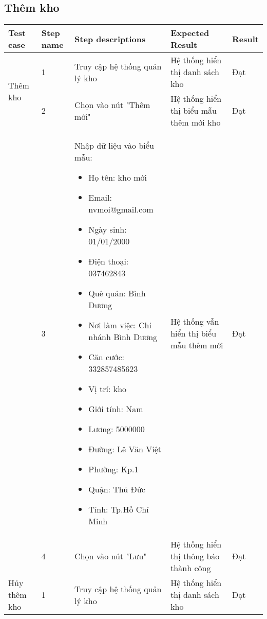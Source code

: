 \subsection{Thêm kho}
{
    \setlength\extrarowheight{6pt}
    \begin{longtable}{| p{2.5cm}| p{1cm}| p{5.5cm}| p{4.5cm} | p{1.5cm} |}
        \hline
        \textbf{Test case} & \textbf{Step name} & \textbf{Step descriptions} & \textbf{Expected Result} & \textbf{Result} \\
        \hline
        \multirow[t]{2}{2.5cm}{Thêm kho} & 1 & Truy cập hệ thống quản lý kho & Hệ thống hiển thị danh sách kho & Đạt \\
        \cline{2-5}
         & 2 & Chọn vào nút "Thêm mới" & Hệ thống hiển thị biểu mẫu thêm mới kho & Đạt \\
        \cline{2-5}
        & 3 & Nhập dữ liệu vào biểu mẫu:
        \begin{itemize}
            \item Họ tên: kho mới
            \item Email: nvmoi@gmail.com
            \item Ngày sinh: 01/01/2000
            \item Điện thoại: 037462843
            \item Quê quán: Bình Dương
            \item Nơi làm việc: Chi nhánh Bình Dương
            \item Căn cước: 332857485623
            \item Vị trí: kho
            \item Giới tính: Nam
            \item Lương: 5000000
            \item Đường: Lê Văn Việt
            \item Phường: Kp.1
            \item Quận: Thủ Đức 
            \item Tỉnh: Tp.Hồ Chí Minh
        \end{itemize} & Hệ thống vẫn hiển thị biểu mẫu thêm mới & Đạt \\
        \cline{2-5}
         & 4 & Chọn vào nút "Lưu" & Hệ thống hiển thị thông báo thành công & Đạt \\
        \hline
        \multirow[t]{2}{2.5cm}{Hủy thêm kho} & 1 & Truy cập hệ thống quản lý kho & Hệ thống hiển thị danh sách kho & Đạt \\

\end{longtable}}
